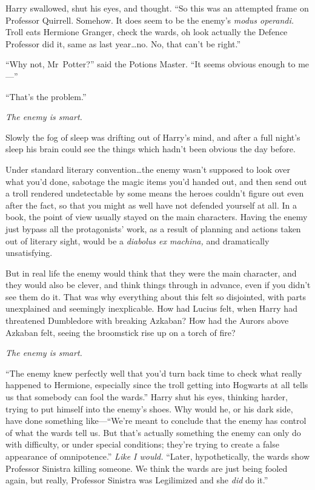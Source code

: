 Harry swallowed, shut his eyes, and thought. “So this was an attempted frame on Professor Quirrell. Somehow. It does seem to be the enemy’s \emph{modus operandi.} Troll eats Hermione Granger, check the wards, oh look actually the Defence Professor did it, same as last year…no. No, that can’t be right.”

“Why not, Mr~Potter?” said the Potions Master. “It seems obvious enough to me—”

“That’s the problem.”

\emph{The enemy is smart.}

Slowly the fog of sleep was drifting out of Harry’s mind, and after a full night’s sleep his brain could see the things which hadn’t been obvious the day before.

Under standard literary convention…the enemy wasn’t supposed to look over what you’d done, sabotage the magic items you’d handed out, and then send out a troll rendered undetectable by some means the heroes couldn’t figure out even after the fact, so that you might as well have not defended yourself at all. In a book, the point of view usually stayed on the main characters. Having the enemy just bypass all the protagonists’ work, as a result of planning and actions taken out of literary sight, would be a \emph{diabolus ex machina,} and dramatically unsatisfying.

But in real life the enemy would think that they were the main character, and they would also be clever, and think things through in advance, even if you didn’t see them do it. That was why everything about this felt so disjointed, with parts unexplained and seemingly inexplicable. How had Lucius felt, when Harry had threatened Dumbledore with breaking Azkaban? How had the Aurors above Azkaban felt, seeing the broomstick rise up on a torch of fire?

\emph{The enemy is smart.}

“The enemy knew perfectly well that you’d turn back time to check what really happened to Hermione, especially since the troll getting into Hogwarts at all tells us that somebody can fool the wards.” Harry shut his eyes, thinking harder, trying to put himself into the enemy’s shoes. Why would he, or his dark side, have done something like—“We’re meant to conclude that the enemy has control of what the wards tell us. But that’s actually something the enemy can only do with difficulty, or under special conditions; they’re trying to create a false appearance of omnipotence.” \emph{Like I would.} “Later, hypothetically, the wards show Professor Sinistra killing someone. We think the wards are just being fooled again, but really, Professor Sinistra was Legilimized and she \emph{did} do it.”

